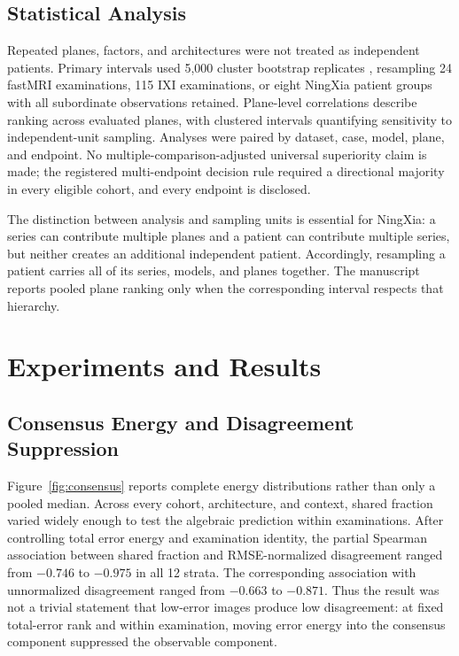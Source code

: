 \documentclass[journal,10pt]{IEEEtran}
\begin{document}
\subsection{Statistical Analysis}
Repeated planes, factors, and architectures were not treated as independent patients. Primary intervals used 5,000 cluster bootstrap replicates \cite{efron1994bootstrap}, resampling 24 fastMRI examinations, 115 IXI examinations, or eight NingXia patient groups with all subordinate observations retained. Plane-level correlations describe ranking across evaluated planes, with clustered intervals quantifying sensitivity to independent-unit sampling. Analyses were paired by dataset, case, model, plane, and endpoint. No multiple-comparison-adjusted universal superiority claim is made; the registered multi-endpoint decision rule required a directional majority in every eligible cohort, and every endpoint is disclosed.

The distinction between analysis and sampling units is essential for NingXia: a series can contribute multiple planes and a patient can contribute multiple series, but neither creates an additional independent patient. Accordingly, resampling a patient carries all of its series, models, and planes together. The manuscript reports pooled plane ranking only when the corresponding interval respects that hierarchy.

\section{Experiments and Results}
\subsection{Consensus Energy and Disagreement Suppression}
Figure~\ref{fig:consensus} reports complete energy distributions rather than only a pooled median. Across every cohort, architecture, and context, shared fraction varied widely enough to test the algebraic prediction within examinations. After controlling total error energy and examination identity, the partial Spearman association between shared fraction and RMSE-normalized disagreement ranged from $-0.746$ to $-0.975$ in all 12 strata. The corresponding association with unnormalized disagreement ranged from $-0.663$ to $-0.871$. Thus the result was not a trivial statement that low-error images produce low disagreement: at fixed total-error rank and within examination, moving error energy into the consensus component suppressed the observable component.
\end{document}
